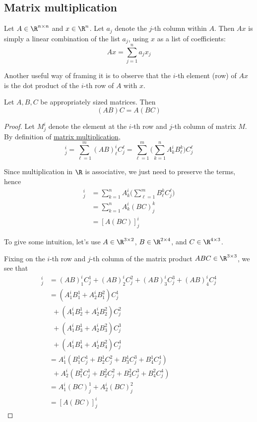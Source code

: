 \subsection{Matrix multiplication}\label{aefa5e1}

\label{c3efdcc}

Let $A\in\R^{n\times n}$ and $x\in\R^n$. Let $a_j$ denote the $j$-th column
within $A$. Then $Ax$ is simply a linear combination of the list $a_j$, using
$x$ as a list of coefficients:
$$
  Ax=\sum_{j=1}^n a_jx_j
$$

Another useful way of framing it is to observe that the $i$-th element (row) of
$Ax$ is the dot product of the $i$-th row of $A$ with $x$.

\label{a7d4369}

Let $A,B,C$ be appropriately sized matrices. Then
$$
  (AB)C=A(BC)
$$

\begin{proof}
  Let $M^i_j$ denote the element at the $i$-th row and $j$-th column of matrix
  $M$. By definition of \href{d786633}{matrix multiplication},
  \begin{equation*}
    [(AB)C]^i_j
    =\sum_{\ell=1}^m(AB)^i_\ell C^\ell_j
    =\sum_{\ell=1}^m\biggl(\sum_{k=1}^nA^i_kB^k_\ell\biggr)C^\ell_j
  \end{equation*}

  Since multiplication in $\R$ is associative, we just need to preserve the
  terms, hence
  \begin{align*}
    [(AB)C]^i_j
     &=\sum_{k=1}^nA^i_k\biggl(\sum_{\ell=1}^mB^k_\ell C^\ell_j\biggr) \\
     &=\sum_{k=1}^nA^i_k(BC)^k_j                                       \\
     &=[A(BC)]^i_j
  \end{align*}

  To give some intuition, let's use $A\in\R^{3\times2}$, $B\in\R^{2\times4}$,
  and $C\in\R^{4\times3}$.

  Fixing on the $i$-th row and $j$-th column of the matrix product
  $ABC\in\R^{3\times3}$, we see that
  \begin{align*}
    [(AB)C]^i_j
     &=(AB)^i_1C^1_j+(AB)^i_2C^2_j+(AB)^i_3C^3_j+(AB)^i_4C^4_j \\
     &=(A^i_1B^1_1+A^i_2B^2_1)C^1_j                            \\
     &\ \ +(A^i_1B^1_2+A^i_2B^2_2)C^2_j                        \\
     &\ \ +(A^i_1B^1_3+A^i_2B^2_3)C^3_j                        \\
     &\ \ +(A^i_1B^1_4+A^i_2B^2_4)C^4_j                        \\
     &=A^i_1(B^1_1C^1_j+B^1_2C^2_j+B^1_3C^3_j+B^1_4C^4_j)      \\
     &\ \ +A^i_2(B^2_1C^1_j+B^2_2C^2_j+B^2_3C^3_j+B^2_4C^4_j)  \\
     &=A^i_1(BC)^1_j+A^i_2(BC)^2_j                             \\
     &=[A(BC)]^i_j
  \end{align*}
\end{proof}

